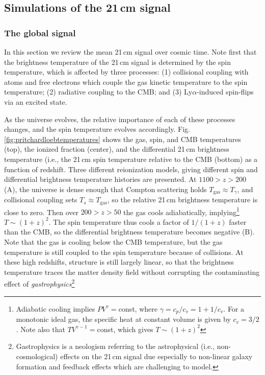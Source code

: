 \subsection{Simulations of the 21\,cm signal}
\subsubsection{The global signal}
\label{sec:globalsignal}

In this section we review the mean 21\,cm signal over cosmic time. Note first that the brightness temperature of the 21\,cm signal is determined by the spin temperature, which is affected by three processes: (1) collisional coupling with atoms and free electrons which couple the gas kinetic temperature to the spin temperature; (2)  radiative coupling to the CMB; and (3) Ly$\alpha$-induced spin-flips via an excited state. 

As the universe evolves, the relative importance of each of these processes changes, and the spin temperature evolves accordingly. Fig. \ref{fig:pritchardloebtemperatures} shows the gas, spin, and CMB temperatures (top), the ionized fraction (center), and the differential 21\,cm brightness temperature (i.e., the 21\,cm spin temperature relative to the CMB (bottom) as a function of redshift. Three different reionization models, giving different spin and differential brightness temperature histories are presented. At $1100>z>200$ (A), the universe is dense enough that Compton scattering holds $T_\text{gas}\approx T_\gamma$, and collisional coupling sets $T_s\approx T_\text{gas}$, so the relative 21\,cm brightness temperature is close to zero. Then over $200>z>50$ the gas cools adiabatically, implying\footnote{Adiabatic cooling implies $PV^\gamma=$const, where $\gamma=c_p/c_v=1+1/c_v$. For a monotonic ideal gas, the specific heat at constant volume is given by $c_v=3/2$. Note also that $TV^{\gamma-1}=$const, which gives $T\sim (1+z)^2$} $T\sim (1+z)^2$. The spin temperature thus cools a factor of $1/(1+z)$ faster than the CMB, so the differential brightness temperature becomes negative (B). Note that the gas is cooling below the CMB temperature, but the gas temperature is still coupled to the spin temperature because of collisions. At these high redshifts, structure is still largely linear, so that the brightness temperature traces the matter density field without corrupting the contaminating effect of \textit{gastrophysics}\footnote{Gastrophysics is a neologism referring to the astrophysical (i.e., non-cosmological) effects on the 21\,cm signal due especially to non-linear galaxy formation and feedback effects which are challenging to model.} 

